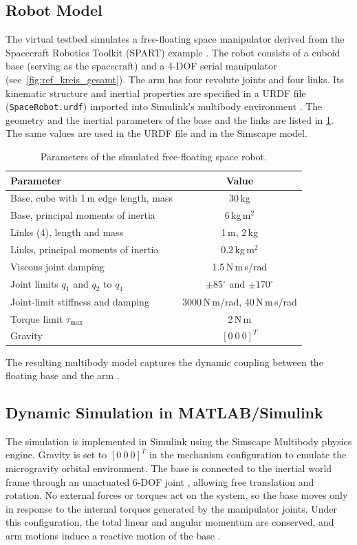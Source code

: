 \documentclass{ieeeaccess}
\begin{document}
\subsection{Robot Model} The virtual testbed simulates a free-floating space manipulator derived from the
Spacecraft Robotics Toolkit (SPART) example \cite{b9}. The robot consists of a cuboid base (serving as
the spacecraft) and a 4-DOF serial manipulator (see~\cref{fig:ref_kreis_gesamt}). The arm has four
revolute joints and four links. Its kinematic structure and inertial properties are specified in a URDF
file (\texttt{SpaceRobot.urdf}) imported into Simulink's multibody environment \cite{b25,b26,b27}. The
geometry and the inertial parameters of the base and the links are listed in \cref{tab:robot_params}. The
same values are used in the URDF file and in the Simscape model.

\begin{table}[!t]
\centering
\caption{Parameters of the simulated free-floating space robot.}
\label{tab:robot_params}
\begin{tabular}{lc}
\toprule
\textbf{Parameter} & \textbf{Value} \\
\midrule
Base, cube with 1\,m edge length, mass & 30\,kg \\
Base, principal moments of inertia & 6\,kg\,m$^2$ \\
Links (4), length and mass & 1\,m, 2\,kg \\
Links, principal moments of inertia & 0.2\,kg\,m$^2$ \\
Viscous joint damping & 1.5\,N\,m\,s/rad \\
Joint limits $q_1$ and $q_2$ to $q_4$ & $\pm 85^\circ$ and $\pm 170^\circ$ \\
Joint-limit stiffness and damping & 3000\,N\,m/rad, 40\,N\,m\,s/rad \\
Torque limit $\tau_{\max}$ & 2\,N\,m \\
Gravity & $[0~0~0]^T$ \\
\bottomrule
\end{tabular}
\end{table}
 The resulting multibody model captures the dynamic coupling between the floating base
and the arm \cite{b6}.

\subsection{Dynamic Simulation in MATLAB/Simulink} The simulation is implemented in Simulink using the
Simscape Multibody physics engine. Gravity is set to $[0~0~0]^T$ in the mechanism configuration
\cite{b28} to emulate the microgravity orbital environment. The base is connected to the inertial world
frame through an unactuated 6-DOF joint \cite{b3}, allowing free translation and rotation. No external
forces or torques act on the system, so the base moves only in response to the internal torques
generated by the manipulator joints. Under this configuration, the total linear and angular momentum are
conserved, and arm motions induce a reactive motion of the base \cite{b6,kaigom2011optimal}.
\end{document}

